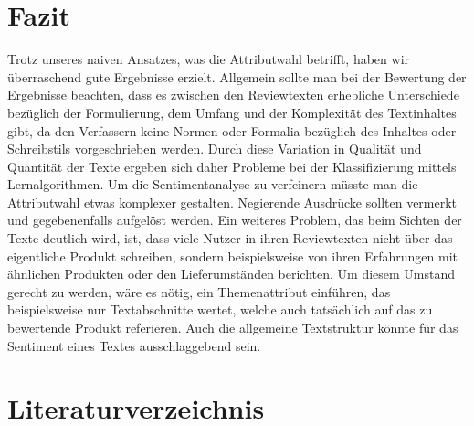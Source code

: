 \documentclass[a4paper]{article}
\begin{document}
\section{Fazit}


Trotz unseres naiven Ansatzes, was die Attributwahl betrifft, haben wir überraschend gute Ergebnisse erzielt.\newline
Allgemein sollte man bei der Bewertung der Ergebnisse beachten, dass es zwischen den Reviewtexten erhebliche Unterschiede bezüglich der Formulierung, dem Umfang und der Komplexität des Textinhaltes gibt, da den Verfassern keine Normen oder Formalia bezüglich des Inhaltes oder Schreibstils vorgeschrieben werden. Durch diese Variation in Qualität und Quantität der Texte ergeben sich daher Probleme bei der Klassifizierung mittels Lernalgorithmen. 
Um die Sentimentanalyse zu verfeinern müsste man die Attributwahl etwas komplexer gestalten. Negierende Ausdrücke sollten vermerkt und gegebenenfalls aufgelöst werden.
Ein weiteres Problem, das beim Sichten der Texte deutlich wird, ist, dass viele Nutzer in ihren Reviewtexten nicht über das eigentliche Produkt schreiben, sondern beispielsweise von ihren Erfahrungen mit ähnlichen Produkten oder den Lieferumständen berichten.\newline
Um diesem Umstand gerecht zu werden, wäre es nötig, ein Themenattribut einführen, das beispielsweise nur Textabschnitte wertet, welche auch tatsächlich auf das zu bewertende Produkt referieren. Auch die allgemeine Textstruktur könnte für das Sentiment eines Textes ausschlaggebend sein.



\section{Literaturverzeichnis}



\printbibliography
\end{document}
